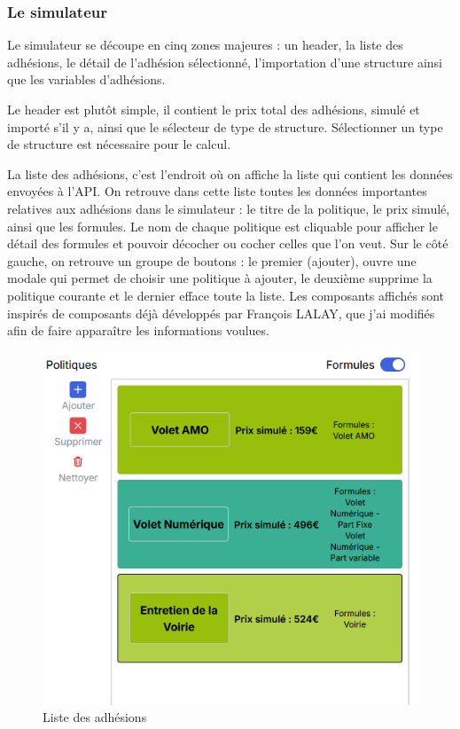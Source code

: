 \documentclass[a4paper,12pt]{report}
\begin{document}
\subsubsection{Le simulateur}

Le simulateur se découpe en cinq zones majeures : un header, la liste des adhésions, le détail de l'adhésion sélectionné, l'importation d'une structure ainsi que les variables d'adhésions.

\vspace{1em}

Le header est plutôt simple, il contient le prix total des adhésions, simulé et importé s'il y a, ainsi que le sélecteur de type de structure. Sélectionner un type de structure est nécessaire pour le calcul.

\vspace{1em}

La liste des adhésions, c'est l'endroit où on affiche la liste qui contient les données envoyées à l'API. On retrouve dans cette liste toutes les données importantes relatives aux adhésions dans le simulateur : le titre de la politique, le prix simulé, ainsi que les formules. Le nom de chaque politique est cliquable pour afficher le détail des formules et pouvoir décocher ou cocher celles que l'on veut. Sur le côté gauche, on retrouve un groupe de boutons  : le premier (ajouter), ouvre une modale qui permet de choisir une politique à ajouter, le deuxième supprime la politique courante et le dernier efface toute la liste. Les composants affichés sont inspirés de composants déjà développés par François LALAY, que j'ai modifiés afin de faire apparaître les informations voulues.

\begin{figure}[H]
    \centering
    \includegraphics[scale=0.5]{adhesionList.png}
    \caption{Liste des adhésions}
    \label{fig:list-adhe}
\end{figure}
\end{document}
